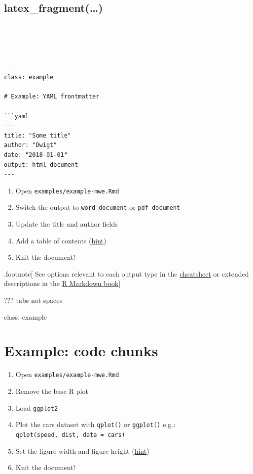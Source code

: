 \documentclass[]{article}
\providecommand{\tightlist}{%
  \setlength{\itemsep}{0pt}\setlength{\parskip}{0pt}}
\begin{document}
\hypertarget{latex_fragment}{%
\subsection{latex\_fragment(\ldots)}\label{latex_fragment}}

\begin{verbatim}




---
class: example

# Example: YAML frontmatter 

```yaml
---
title: "Some title"
author: "Dwigt"
date: "2018-01-01"
output: html_document
---
\end{verbatim}

\begin{enumerate}
\def\labelenumi{\arabic{enumi}.}
\item
  Open \texttt{examples/example-mwe.Rmd}
\item
  Switch the output to \texttt{word\_document} or \texttt{pdf\_document}
\item
  Update the title and author fields
\item
  Add a table of contents
  (\href{https://bookdown.org/yihui/rmarkdown/pdf-document.html\#table-of-contents-1}{hint})
\item
  Knit the document!
\end{enumerate}

.footnote{[} See options relevant to each output type in the
\href{https://github.com/rstudio/cheatsheets/raw/master/rmarkdown-2.0.pdf}{cheatsheet}
or extended descriptions in the
\href{https://bookdown.org/yihui/rmarkdown}{R Markdown book}{]}

??? tabs not spaces

class: example

\hypertarget{example-code-chunks}{%
\section{Example: code chunks}\label{example-code-chunks}}

\begin{enumerate}
\def\labelenumi{\arabic{enumi}.}
\tightlist
\item
  Open \texttt{examples/example-mwe.Rmd}
\item
  Remove the base R plot
\item
  Load \texttt{ggplot2}
\item
  Plot the cars dataset with \texttt{qplot()} or \texttt{ggplot()} e.g.:
  \texttt{qplot(speed,\ dist,\ data\ =\ cars)}
\item
  Set the figure width and figure height
  (\href{https://yihui.name/knitr/options/\#plots}{hint})
\item
  Knit the document!
\end{enumerate}
\end{document}
